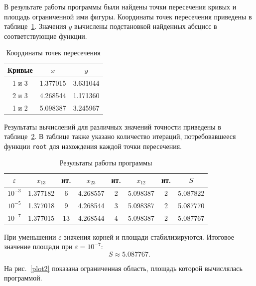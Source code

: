 \documentclass[a4paper,12pt,titlepage,finall]{article}
\begin{document}
В результате работы программы были найдены точки пересечения кривых и площадь ограниченной ими фигуры. Координаты точек пересечения приведены в таблице~\ref{table1}. Значения \(y\) вычислены подстановкой найденных абсцисс в соответствующие функции.

\begin{table}[h]
\centering
\begin{tabular}{|c|c|c|}
\hline
Кривые & $x$ & $y$ \\
\hline
1 и 3 & 1.377015 & 3.631044 \\
2 и 3 & 4.268544 & 1.171360 \\
1 и 2 & 5.098387 & 3.245967 \\
\hline
\end{tabular}
\caption{Координаты точек пересечения}
\label{table1}
\end{table}

Результаты вычислений для различных значений точности приведены в таблице~\ref{table2}. В таблице также указано количество итераций, потребовавшееся функции \texttt{root} для нахождения каждой точки пересечения.

\begin{table}[h]
\centering
\begin{tabular}{|c|c|c|c|c|c|c|c|}
\hline
$\varepsilon$ & $x_{13}$ & ит. & $x_{23}$ & ит. & $x_{12}$ & ит. & $S$ \\
\hline
$10^{-3}$ & 1.377182 & 6 & 4.268557 & 2 & 5.098387 & 2 & 5.087822 \\
$10^{-5}$ & 1.377018 & 9 & 4.268544 & 3 & 5.098387 & 2 & 5.087770 \\
$10^{-7}$ & 1.377015 & 13 & 4.268544 & 4 & 5.098387 & 2 & 5.087767 \\
\hline
\end{tabular}
\caption{Результаты работы программы}
\label{table2}
\end{table}

При уменьшении \(\varepsilon\) значения корней и площади стабилизируются. Итоговое значение площади при \(\varepsilon=10^{-7}\):
\[
    S\approx 5.087767.
\]

На рис.~\ref{plot2} показана ограниченная область, площадь которой вычислялась программой.
\end{document}

